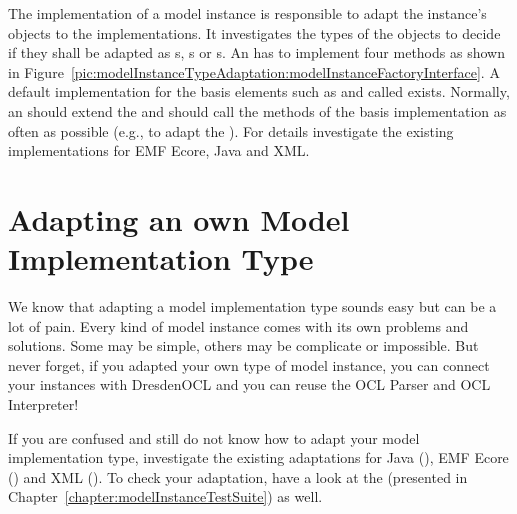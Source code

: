 The  implementation of a model instance is
responsible to adapt the instance's objects to the  
implementations. It investigates the types of the objects to decide if they
shall be adapted as s, 
s or
s. An  has to
implement four methods as shown in 
Figure~\ref{pic:modelInstanceTypeAdaptation:modelInstanceFactoryInterface}. A 
default implementation for the basis elements such as
 and  called 
 exists. Normally, an 
 should extend the 
 and should call the methods of
the basis implementation as often as possible (e.g., to adapt the 
). For details investigate the existing
implementations for \acs{EMF} Ecore, Java and \acs{XML}.



\section{Adapting an own Model Implementation Type}

We know that adapting a model implementation type sounds easy but can be a lot
of pain. Every kind of model instance comes with its own problems and solutions.
Some may be simple, others may be complicate or impossible. But never forget, if
you adapted your own type of model instance, you can connect your instances with
DresdenOCL and you can reuse the \acs{OCL} Parser and \acs{OCL} Interpreter!

If you are confused and still do not know how to adapt your model implementation
type, investigate the existing adaptations for Java 
(), \acs{EMF} Ecore
() and \acs{XML}
().
To check your adaptation, have a look at the 
(presented in Chapter~\ref{chapter:modelInstanceTestSuite}) as well.
